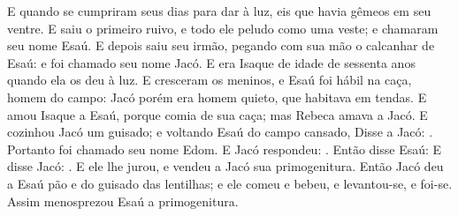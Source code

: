 {{  E quando se cumpriram seus dias para dar à luz, eis que havia gêmeos em seu ventre.
  E saiu o primeiro ruivo, e todo ele peludo como uma veste; e chamaram seu nome Esaú.
  E depois saiu seu irmão, pegando com sua mão o calcanhar de Esaú: e foi chamado seu nome Jacó. E era Isaque de idade de sessenta anos quando ela os deu à luz.
  E cresceram os meninos, e Esaú foi hábil na caça, homem do campo: Jacó porém era homem quieto, que habitava em tendas.
  E amou Isaque a Esaú, porque comia de sua caça; mas Rebeca amava a Jacó.
  E cozinhou Jacó um guisado; e voltando Esaú do campo cansado,
  Disse a Jacó: . Portanto foi chamado seu nome Edom.
  E Jacó respondeu: .
  Então disse Esaú: 
  E disse Jacó: . E ele lhe jurou, e vendeu a Jacó sua primogenitura.
  Então Jacó deu a Esaú pão e do guisado das lentilhas; e ele comeu e bebeu, e levantou-se, e foi-se. Assim menosprezou Esaú a primogenitura.
\par }

}
